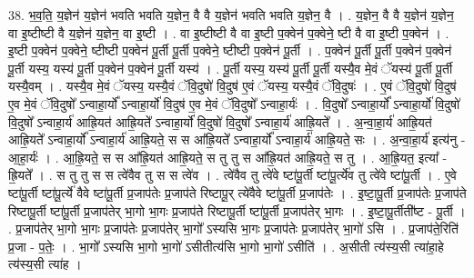 \documentclass[17pt]{extarticle}
\begin{document}
38. भ॒व॒ति॒ य॒ज्ञेन॑ य॒ज्ञेन॑ भवति भवति य॒ज्ञेन॒ वै वै य॒ज्ञेन॑ भवति भवति य॒ज्ञेन॒ वै । . य॒ज्ञेन॒ वै वै य॒ज्ञेन॑ य॒ज्ञेन॒ वा इ॒ष्टीष्टी वै य॒ज्ञेन॑ य॒ज्ञेन॒ वा इ॒ष्टी । . वा इ॒ष्टीष्टी वै वा इ॒ष्टी प॒क्वेन॑ प॒क्वेने॒ ष्टी वै वा इ॒ष्टी प॒क्वेन॑ । . इ॒ष्टी प॒क्वेन॑ प॒क्वेने॒ ष्टीष्टी प॒क्वेन॑ पू॒र्ती पू॒र्ती प॒क्वेने॒ ष्टीष्टी प॒क्वेन॑ पू॒र्ती । . प॒क्वेन॑ पू॒र्ती पू॒र्ती प॒क्वेन॑ प॒क्वेन॑ पू॒र्ती यस्य॒ यस्य॑ पू॒र्ती प॒क्वेन॑ प॒क्वेन॑ पू॒र्ती यस्य॑ । . पू॒र्ती यस्य॒ यस्य॑ पू॒र्ती पू॒र्ती यस्यै॒व मे॒वं ॅयस्य॑ पू॒र्ती पू॒र्ती यस्यै॒वम् । . यस्यै॒व मे॒वं ॅयस्य॒ यस्यै॒वं ॅवि॒दुषो॑ वि॒दुष॑ ए॒वं ॅयस्य॒ यस्यै॒वं ॅवि॒दुषः॑ । . ए॒वं ॅवि॒दुषो॑ वि॒दुष॑ ए॒व मे॒वं ॅवि॒दुषो᳚ ऽन्वाहा॒र्यो᳚ ऽन्वाहा॒र्यो॑ वि॒दुष॑ ए॒व मे॒वं ॅवि॒दुषो᳚ ऽन्वाहा॒र्यः॑ । . वि॒दुषो᳚ ऽन्वाहा॒र्यो᳚ ऽन्वाहा॒र्यो॑ वि॒दुषो॑ वि॒दुषो᳚ ऽन्वाहा॒र्य॑ आह्रि॒यत॑ आह्रि॒यते᳚ ऽन्वाहा॒र्यो॑ वि॒दुषो॑ वि॒दुषो᳚ ऽन्वाहा॒र्य॑ आह्रि॒यते᳚ । . अ॒न्वा॒हा॒र्य॑ आह्रि॒यत॑ आह्रि॒यते᳚ ऽन्वाहा॒र्यो᳚ ऽन्वाहा॒र्य॑ आह्रि॒यते॒ स स आ᳚ह्रि॒यते᳚ ऽन्वाहा॒र्यो᳚ ऽन्वाहा॒र्य॑ आह्रि॒यते॒ सः । . अ॒न्वा॒हा॒र्य॑ इत्य॑नु - आ॒हा॒र्यः॑ । . आ॒ह्रि॒यते॒ स स आ᳚ह्रि॒यत॑ आह्रि॒यते॒ स तु तु स आ᳚ह्रि॒यत॑ आह्रि॒यते॒ स तु । . आ॒ह्रि॒यत॒ इत्या᳚ - ह्रि॒यते᳚ । . स तु तु स स त्वे॑वैव तु स स त्वे॑व । . त्वे॑वैव तु त्वे॑वे ष्टा॑पू॒र्ती ष्टा॑पू॒र्त्ये॑व तु त्वे॑वे ष्टा॑पू॒र्ती । . ए॒वे ष्टा॑पू॒र्ती ष्टा॑पू॒र्त्ये॑ वैवे ष्टा॑पू॒र्ती प्र॒जाप॑तेः प्र॒जाप॑ते रिष्टापू॒र् त्ये॑वैवे ष्टा॑पू॒र्ती प्र॒जाप॑तेः । . इ॒ष्टा॒पू॒र्ती प्र॒जाप॑तेः प्र॒जाप॑ते रिष्टापू॒र्ती ष्टा॑पू॒र्ती प्र॒जाप॑तेर् भा॒गो भा॒गः प्र॒जाप॑ते रिष्टापू॒र्ती ष्टा॑पू॒र्ती प्र॒जाप॑तेर् भा॒गः । . इ॒ष्टा॒पू॒र्तीती᳚ष्ट - पू॒र्ती । . प्र॒जाप॑तेर् भा॒गो भा॒गः प्र॒जाप॑तेः प्र॒जाप॑तेर् भा॒गो᳚ ऽस्यसि भा॒गः प्र॒जाप॑तेः प्र॒जाप॑तेर् भा॒गो॑ ऽसि । . प्र॒जाप॑ते॒रिति॑ प्र॒जा - प॒तेः॒ । . भा॒गो᳚ ऽस्यसि भा॒गो भा॒गो॑ ऽसीतीत्य॑सि भा॒गो भा॒गो॑ ऽसीति॑ । . अ॒सीती त्य॑स्य॒सी त्या॑हा॒हे त्य॑स्य॒सी त्या॑ह । \newline
\pagebreak
{}
\end{document}
